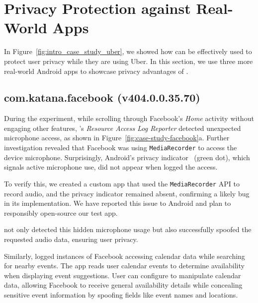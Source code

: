 \section{Privacy Protection against Real-World Apps}
\label{sec:protecting_up}

In Figure~\ref{fig:intro_case_study_uber}, we showed how \framework{} can be effectively used to protect user privacy while they are using Uber. In this section, we use three more real-world Android apps to showcase privacy advantages of \framework{}.

\subsection{com.katana.facebook (v404.0.0.35.70)}
\label{sec:fb_case_study}
 
During the experiment, while scrolling through Facebook’s \textit{Home} activity without engaging other features, \framework{}'s \textit{Resource Access Log Reporter} detected unexpected microphone access, as shown in Figure~\ref{fig:case-study-facebook}a. Further investigation revealed that Facebook was using \texttt{MediaRecorder} to access the device microphone. Surprisingly, Android’s privacy indicator~\cite{andPrivacyIndicator} (green dot), which signals active microphone use, did not appear when \framework{} logged the access.

To verify this, we created a custom app that used the \texttt{MediaRecorder} API to record audio, and the privacy indicator remained absent, confirming a likely bug in its implementation. We have reported this issue to Android and plan to responsibly open-source our test app.

\framework{} not only detected this hidden microphone usage but also successfully spoofed the requested audio data, ensuring user privacy.

Similarly, \framework{} logged instances of Facebook accessing calendar data while searching for nearby events. The app reads user calendar events to determine availability when displaying event suggestions. User can configure \framework{} to manipulate calendar data, allowing Facebook to receive general availability details while concealing sensitive event information by spoofing fields like event names and locations.

